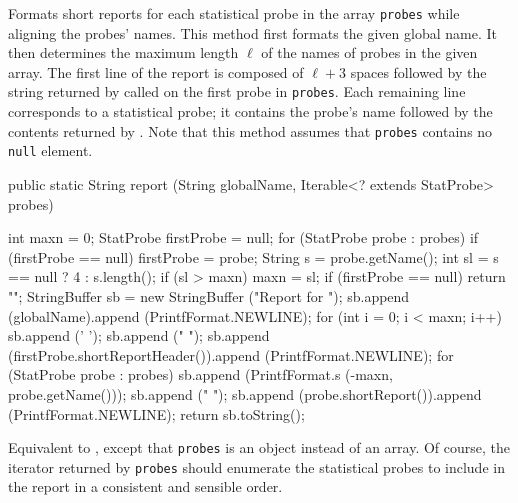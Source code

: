 \begin{tabb}  Formats short reports for each statistical probe in the array
   \texttt{probes} while aligning the probes' names.
   This method first formats the given global name.
   It then determines the maximum length $\ell$ of the names of probes in the
   given array.
   The first line of the report is composed of $\ell+3$ spaces followed by the
   string returned by  called on the first probe in
   \texttt{probes}. Each remaining line corresponds to a statistical probe; it
   contains the probe's name followed by the contents returned by
   . Note that this method assumes that \texttt{probes}
   contains no \texttt{null} element.
\end{tabb}
\begin{htmlonly}
\end{htmlonly}
\begin{code}

   public static String report (String globalName,
                                Iterable<? extends StatProbe> probes)\begin{hide} {
      int maxn = 0;
      StatProbe firstProbe = null;
      for (StatProbe probe : probes) {
         if (firstProbe == null)
            firstProbe = probe;
         String s = probe.getName();
         int sl = s == null ? 4 : s.length();
         if (sl > maxn)
            maxn = sl;
      }
      if (firstProbe == null)
         return "";
      StringBuffer sb = new StringBuffer ("Report for ");
      sb.append (globalName).append (PrintfFormat.NEWLINE);
      for (int i = 0; i < maxn; i++)
         sb.append (' ');
      sb.append ("   ");
      sb.append (firstProbe.shortReportHeader()).append (PrintfFormat.NEWLINE);
      for (StatProbe probe : probes) {
         sb.append
            (PrintfFormat.s (-maxn, probe.getName()));
         sb.append ("   ");
         sb.append (probe.shortReport()).append (PrintfFormat.NEWLINE);
      }
      return sb.toString();
   }\end{hide}
\end{code}
\begin{tabb}  Equivalent to , except that
   \texttt{probes} is an  object instead of an array.
   Of course, the iterator returned by \texttt{probes} should enumerate the
   statistical probes to include in the report in a consistent and sensible order.
\end{tabb}
